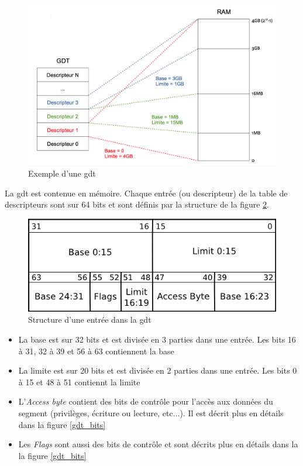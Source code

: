\documentclass[a4paper, 12pt]{article}
\begin{document}
\begin{figure}[!h]
  \centering
  \includegraphics[scale=0.7]{images/gdt.png}
  \caption{Exemple d'une \acrshort{gdt}}
  \label{gdt}
\end{figure}

La \acrshort{gdt} est contenue en mémoire. Chaque entrée (ou descripteur) de
la table de descripteurs sont sur 64 bits et sont définis par la structure de
la figure \ref{gdt_entry}.\cite{ref14}

\begin{figure}[!h]
  \centering
  \includegraphics[scale=0.75]{images/gdt_entry.png}
  \caption{Structure d'une entrée dans la \acrshort{gdt}}
  \label{gdt_entry}
\end{figure}

\begin{itemize}[label=\textbullet]
	\item La base est sur 32 bits et est divisée en 3 parties dans une entrée.
    Les bits 16 à 31, 32 à 39 et 56 à 63 contiennent la base
	\item La limite est sur 20 bits et est divisée en 2 parties dans une entrée.
    Les bits 0 à 15 et 48 à 51 contiennt la limite
	\item L'\textit{Access byte} contient des bits de contrôle pour l'accès aux données
    du segment (privilèges, écriture ou lecture, etc...). Il est décrit plus en détails
    dans la figure \ref{gdt_bits}
    \item Les \textit{Flags} sont aussi des bits de contrôle et sont décrits plus
    en détails dans la la figure \ref{gdt_bits}\cite{ref14}
\end{itemize}
\end{document}
